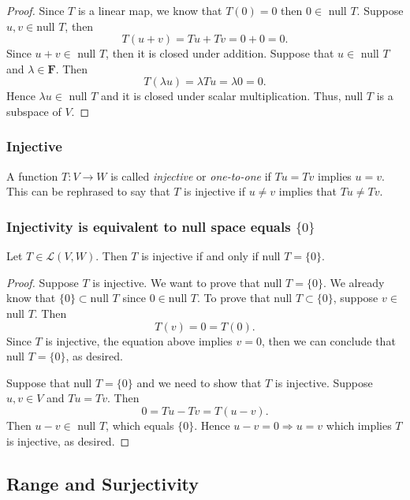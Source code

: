 \documentclass[11pt]{article}
\begin{document}
    \begin{proof}
        Since $T$ is a linear map, we know that \(T(0) = 0\) then \(0 \in\) null $T$.  Suppose $u,v \in \text{null } T$, then \[ T(u+v) = Tu + Tv = 0 + 0 = 0. \] Since \(u+v \in \) null $T$, then it is closed under addition. Suppose that \(u \in \) null $T$ and \(\lambda \in \textbf{F}\). Then \[ T(\lambda u) = \lambda Tu = \lambda 0 = 0. \] Hence \(\lambda u \in \) null $T$ and it is closed under scalar multiplication. Thus, null $T$ is a subspace of $V$. 
    \end{proof}

    \subsubsection{Injective}

    A function \(T:V \rightarrow W\) is called \emph{injective} or \emph{one-to-one} if \(Tu = Tv\) implies \(u = v\). This can be rephrased to say that $T$ is injective if \(u \neq v\) implies that \(Tu \neq Tv\). 

    \subsubsection{Injectivity is equivalent to null space equals \(\{0\}\)}

    Let \(T \in \mathcal{L}(V,W)\). Then $T$ is injective if and only if null $T = \{0\}$.

    \begin{proof}
        Suppose $T$ is injective. We want to prove that null $T = \{ 0 \}$. We already know that \(\{0\} \subset \text{null } T\) since \(0 \in \text{null } T\). To prove that null \(T \subset \{0\}\), suppose \(v \in\) null $T$. Then \[ T(v) = 0 = T(0). \] Since $T$ is injective, the equation above implies $v = 0$, then we can conclude that null \(T = \{0\}\), as desired.

        Suppose that null \(T = \{0\}\) and we need to show that $T$ is injective. Suppose \(u,v \in V\) and \(Tu = Tv\). Then \[0 = Tu - Tv = T(u-v).\] Then \(u - v \in \) null $T$, which equals \(\{0\}\). Hence \(u - v = 0 \Rightarrow u = v\) which implies $T$ is injective, as desired. 
    \end{proof}

    \subsection{Range and Surjectivity}
\end{document}
